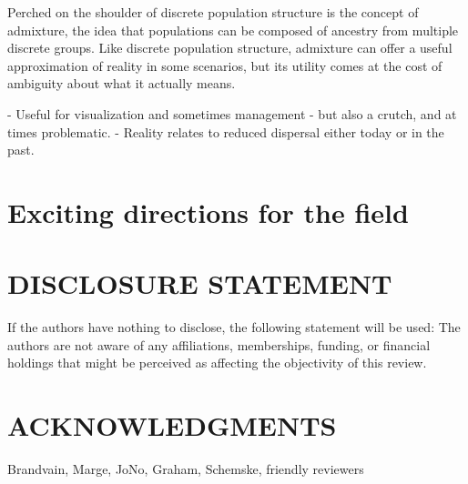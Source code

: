 \documentclass{ar-1col}
\begin{document}
Perched on the shoulder of discrete population structure is the concept of admixture, 
the idea that populations can be composed of ancestry from multiple discrete groups.
Like discrete population structure, 
admixture can offer a useful approximation of reality in some scenarios, 
but its utility comes at the cost of ambiguity about what it actually means.

    - Useful for visualization and sometimes management
    - but also a crutch, and at times problematic.
    - Reality relates to reduced dispersal either today or in the past.


\section{Exciting directions for the field}

\section*{DISCLOSURE STATEMENT}
If the authors have nothing to disclose, the following statement will be used: The authors are not aware of any affiliations, memberships, funding, or financial holdings that
might be perceived as affecting the objectivity of this review. 

\section*{ACKNOWLEDGMENTS}
Brandvain, Marge, JoNo, Graham, Schemske, friendly reviewers
\end{document}
